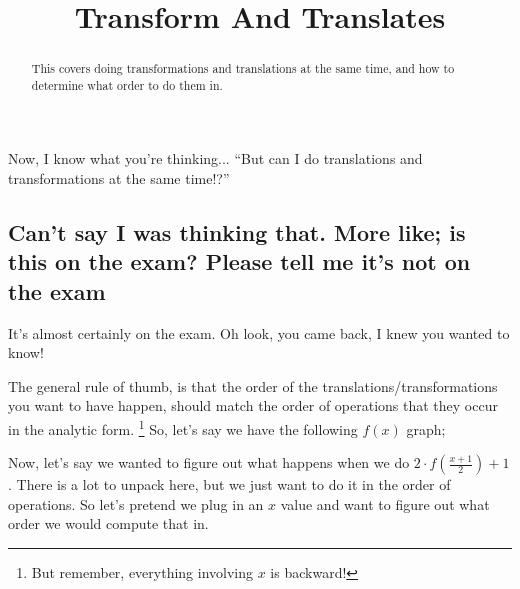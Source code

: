 \documentclass{ximeraXloud}
\title{Transform And Translates}
\begin{document}
\begin{abstract}
    This covers doing transformations and translations at the same time, and how to determine what order to do them in.
\end{abstract}
\maketitle

    Now, I know what you're thinking... ``But can I do translations and transformations at the same time!?''
    
    \subsection*{Can't say I was thinking that. More like; is this on the exam? Please tell me it's not on the exam}
    It's almost certainly on the exam. Oh look, you came back, I knew you wanted to know!
    
    The general rule of thumb, is that the order of the translations/transformations you want to have happen, should match the order of operations that they occur in the analytic form.%
    \footnote{%
        But remember, everything involving $x$ is backward!%
        }
    So, let's say we have the following $f(x)$ graph;
    
    \begin{center}
    \end{center}
    
    Now, let's say we wanted to figure out what happens when we do $2 \cdot f\left(\frac{x+1}{2}\right) + 1$. There is a lot to unpack here, but we just want to do it in the order of operations. So let's pretend we plug in an $x$ value and want to figure out what order we would compute that in. 
    
\end{document}
